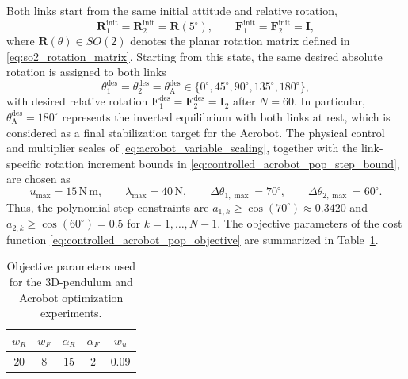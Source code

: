 Both links start from the same initial attitude and relative rotation,
\begin{equation}
    \bm R_1^{\mathrm{init}}
    =\bm R_2^{\mathrm{init}}
    =\bm R(5^\circ),
    \qquad
    \bm F_1^{\mathrm{init}}
    =\bm F_2^{\mathrm{init}}
    =\bm I,
    \label{eq:acrobot_sdp_initial_configuration}
\end{equation}
where $\bm R(\theta)\in SO(2)$ denotes the planar rotation matrix defined in
\eqref{eq:so2_rotation_matrix}. Starting from this state, the same desired
absolute rotation is assigned to both links
\begin{equation}
    \theta_1^{\mathrm{des}}
    =\theta_2^{\mathrm{des}}
    =\theta_{\mathrm A}^{\mathrm{des}}
    \in
    \{0^\circ,45^\circ,90^\circ,135^\circ,180^\circ\},
    \label{eq:acrobot_sdp_target_configurations}
\end{equation}
with desired relative rotation $\bm F_1^{\mathrm{des}}
    =\bm F_2^{\mathrm{des}}
    =\bm I_2$ after $N=60$.
In particular, $\theta_{\mathrm A}^{\mathrm{des}}=180^\circ$ represents the inverted
equilibrium with both links at rest, which is considered as a final stabilization target for the Acrobot.
The physical control and multiplier scales
of \eqref{eq:acrobot_variable_scaling}, together with the link-specific rotation
increment bounds in \eqref{eq:controlled_acrobot_pop_step_bound}, are chosen as
\begin{equation}
    u_{\max}=15\,\mathrm{N\,m},
    \qquad
    \lambda_{\max}=40\,\mathrm{N},
    \qquad
    \Delta\theta_{1,\max}=70^\circ,
    \qquad
    \Delta\theta_{2,\max}=60^\circ.
    \label{eq:acrobot_sdp_optimization_bounds}
\end{equation}
Thus, the polynomial step constraints are
$a_{1,k}\geq\cos(70^\circ)\approx0.3420$ and
$a_{2,k}\geq\cos(60^\circ)=0.5$ for $k=1,\ldots,N-1$. The objective parameters of the 
cost function \eqref{eq:controlled_acrobot_pop_objective} are summarized in
Table~\ref{tab:optimization_cost_parameters}.

\begin{table}[!htbp]
    \centering
    \caption{Objective parameters used for the $3$D-pendulum and Acrobot
    optimization experiments.}
    \label{tab:optimization_cost_parameters}
    \setlength{\tabcolsep}{12pt}
    \renewcommand{\arraystretch}{1.15}
    \begin{tabular}{@{}ccccc@{}}
        \toprule
        $w_R$ & $w_F$ & $\alpha_R$ & $\alpha_F$ & $w_u$ \\
        \midrule
        $20$ & $8$ & $15$ & $2$ & $0.09$ \\
        \bottomrule
    \end{tabular}
\end{table}

